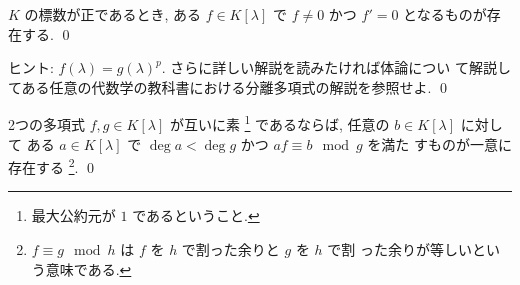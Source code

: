 \documentclass[12pt,twoside]{jarticle}
\begin{document}

\begin{question}
  $K$ の標数が正であるとき, ある $f\in K[\lambda]$ で $f\ne 0$ かつ $f'=0$ 
  となるものが存在する. \qed
\end{question}

\noindent
ヒント: $f(\lambda)=g(\lambda)^p$.  さらに詳しい解説を読みたければ体論につい
て解説してある任意の代数学の教科書における分離多項式の解説を参照せよ.
\qed


%
%


\begin{question}
\label{q:U(K[z]/(g))} 
  2つの多項式 $f,g\in K[\lambda]$ が互いに素%
  \footnote{最大公約元が $1$ であるということ.}
  であるならば, 任意の $b\in K[\lambda]$ に対して
  ある $a\in K[\lambda]$ で $\deg a<\deg g$ かつ $af\equiv b\mod{g}$ を満た
  すものが一意に存在する%
  \footnote{$f\equiv g\mod{h}$ は $f$ を $h$ で割った余りと $g$ を $h$ で割
    った余りが等しいという意味である.}.
  \qed
\end{question}
\end{document}
